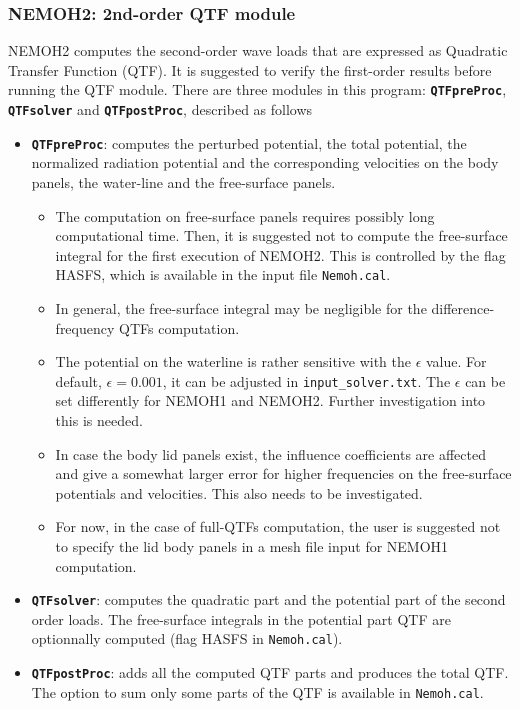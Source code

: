 \documentclass[12pt,a4paper,titlepage]{article}
\begin{document}
\subsubsection{NEMOH2: 2nd-order QTF module}
NEMOH2 computes the second-order wave loads that are expressed as Quadratic Transfer Function (QTF). It is suggested to verify the first-order results before running the QTF module. There are three modules in this program: \texttt{\textbf{QTFpreProc}}, \texttt{\textbf{QTFsolver}} and \texttt{\textbf{QTFpostProc}}, described as follows
\begin{itemize}
\item \texttt{\textbf{QTFpreProc}}: computes the perturbed potential, the total potential, the normalized radiation potential and the corresponding velocities on the body panels, the water-line and the free-surface panels. 
\begin{itemize}
\item The computation on free-surface panels requires possibly long computational time. Then, it is suggested not to compute the free-surface integral for the first execution of NEMOH2. This is controlled by the flag HASFS, which is available in the input file \texttt{Nemoh.cal}.
\item In general, the free-surface integral may be negligible for the difference-frequency QTFs computation.
\item The potential on the waterline is rather sensitive with the $\epsilon$ value. For default, $\epsilon=0.001$, it can be adjusted in \texttt{input\_solver.txt}. The $\epsilon$ can be set differently for NEMOH1 and NEMOH2. Further investigation into this is needed.
\item In case the body lid panels exist, the influence coefficients are affected and give a somewhat larger error for higher frequencies on the free-surface potentials and velocities. This also needs to be investigated.
\item For now, in the case of full-QTFs computation, the user is suggested not to specify the lid body panels in a mesh file input for NEMOH1 computation.
\end{itemize}
\item \texttt{\textbf{QTFsolver}}: computes the quadratic part and the potential part of the second order loads. The free-surface integrals in the potential part QTF are optionnally computed (flag HASFS in \texttt{Nemoh.cal}).
\item \texttt{\textbf{QTFpostProc}}: adds all the computed QTF parts and produces the total QTF. The option to sum only some parts of the QTF is available in \texttt{Nemoh.cal}.
\end{itemize}
\end{document}
